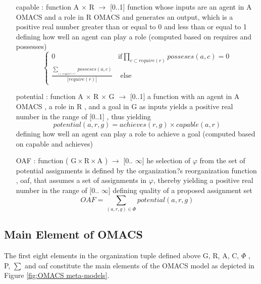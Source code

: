 \begin{itemize}

\item[capable]   
:	function A $\times$ R $\rightarrow$ {[}0..1{]} function whose inputs are an agent in A OMACS
and a role in R OMACS and generates an output, which is a positive real number greater than or equal to 0 
and less than or equal to 1
defining how well an agent can play a role (computed based on requires and possesses)
\begin{equation}
\begin{cases}
0 & \textrm{if}\prod_{c\subset require(r)}posseses(a,c)=0\\
\frac{\sum_{_{c\subset require(r)}}posseses(a,c) }{|require(r)|} & \textrm{ else}
\end{cases}\label{eq:capable equation}
\end{equation}

\item[potential]
: function A $\times$ R $\times$ G $\rightarrow$ {[}0..1{]}  a function with an agent in A OMACS ,
a role in R   , and a goal in G   as inputs yields a positive real number in the range of {[}0..1{]} ,
thus yielding	
\begin{equation}
potential(a,r,g)=achieves(r,g)\times capable(a,r) \label{eq:potential equation}
\end{equation}
defining how well an agent can play a role to achieve a goal (computed based on capable and achieves)

\item[ OAF ] 
: function ( $ \textrm{G} \times \textrm{R}  \times \textrm{A} $ )  $\rightarrow$ {[}0.. $\infty${]} 
he selection of $\varphi$ from the set of potential assignments is defined by the organization?s reorganization function
, oaf, that assumes a set of assignments in $\varphi$,
thereby yielding a positive real number in the range of {[}0.. $\infty${]}
defining quality of a proposed assignment set
\begin{equation}
OAF=\sum_{(a,r,g)\in\varPhi}potential(a,r,g)\label{eq:oaf equation}
\end{equation}


\end{itemize}

\subsection{Main Element of OMACS}



The first eight elements in the organization tuple defined above G, R, A, C, $\varPhi$ , P, $\sum$  and oaf  constitute the main elements of the OMACS model as depicted in Figure \ref{fig:OMACS meta-models}.


